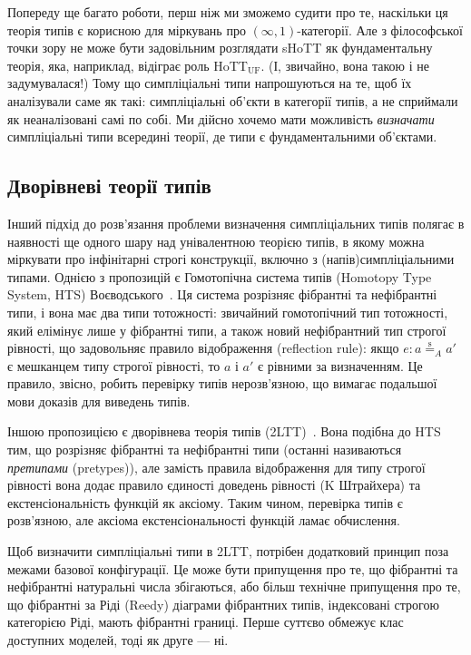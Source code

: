 \documentclass[12pt]{article}
\newcommand*{\inftyone}{\ensuremath{(\infty,1)}}
\newcommand*{\seq}{\overset{\mathrm{s}}{=}}
\newcommand*{\HoTTuf}{HoTT$_{\mathrm{UF}}$}
\begin{document}
Попереду ще багато роботи, перш ніж ми зможемо судити про те, наскільки ця теорія типів є корисною для міркувань про \inftyone-категорії. Але з філософської точки зору не може бути задовільним розглядати sHoTT як фундаментальну теорія, яка, наприклад, відіграє роль \HoTTuf. (І, звичайно, вона такою і не задумувалася!) Тому що симпліціальні типи напрошуються на те, щоб їх аналізували саме як такі: симпліціальні об'єкти в категорії типів, а не сприймали як неаналізовані самі по собі. Ми дійсно хочемо мати можливість \emph{визначати} симпліціальні типи всередині теорії, де типи є фундаментальними об'єктами.

\subsection{Дворівневі теорії типів}

Інший підхід до розв'язання проблеми визначення симпліціальних типів полягає в наявності ще одного шару над унівалентною теорією типів, в якому можна міркувати про інфінітарні строгі конструкції, включно з (напів)симпліціальними типами. Однією з пропозицій є Гомотопічна система типів (Homotopy Type System, HTS) Воєводського~\cite{Voevodsky2013}. Ця система розрізняє фібрантні та нефібрантні типи, і вона має два типи тотожності: звичайний гомотопічний тип тотожності, який елімінує лише у фібрантні типи, а також новий нефібрантний тип строгої рівності, що задовольняє правило відображення (reflection rule): якщо $e:a\seq_A a'$ є мешканцем типу строгої рівності, то $a$ і $a'$ є рівними за визначенням. Це правило, звісно, робить перевірку типів нерозв'язною, що вимагає подальшої мови доказів для виведень типів.

Іншою пропозицією є дворівнева теорія типів (2LTT)~\cite{AltenkirchCapriottiKraus2016,AnnenkovCapriottiKraus2017}. Вона подібна до HTS тим, що розрізняє фібрантні та нефібрантні типи (останні називаються \emph{претипами} (pretypes)), але замість правила відображення для типу строгої рівності вона додає правило єдиності доведень рівності (K Штрайхера) та екстенсіональність функцій як аксіому. Таким чином, перевірка типів є розв'язною, але аксіома екстенсіональності функцій ламає обчислення.

Щоб визначити симпліціальні типи в 2LTT, потрібен додатковий принцип поза межами базової конфігурації. Це може бути припущення про те, що фібрантні та нефібрантні натуральні числа збігаються, або більш технічне припущення про те, що фібрантні за Ріді (Reedy) діаграми фібрантних типів, індексовані строгою категорією Ріді, мають фібрантні границі. Перше суттєво обмежує клас доступних моделей, тоді як друге — ні.
\end{document}
